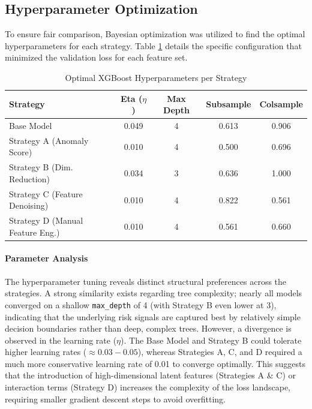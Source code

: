 \documentclass{report}\usepackage[]{graphicx}\usepackage[]{xcolor}
\begin{document}
\subsection{Hyperparameter Optimization}

To ensure fair comparison, Bayesian optimization was utilized to find the optimal hyperparameters for each strategy. Table \ref{tab:params} details the specific configuration that minimized the validation loss for each feature set.

\begin{table}[h]
    \centering
    \caption{Optimal XGBoost Hyperparameters per Strategy}
    \label{tab:params}
    \begin{tabular}{lcccc}
        \hline
        \textbf{Strategy} & \textbf{Eta ($\eta$)} & \textbf{Max Depth} & \textbf{Subsample} & \textbf{Colsample} \\
        \hline
        Base Model & 0.049 & 4 & 0.613 & 0.906 \\
        Strategy A (Anomaly Score) & 0.010 & 4 & 0.500 & 0.696 \\
        Strategy B (Dim. Reduction) & 0.034 & 3 & 0.636 & 1.000 \\
        Strategy C (Feature Denoising) & 0.010 & 4 & 0.822 & 0.561 \\
        Strategy D (Manual Feature Eng.) & 0.010 & 4 & 0.561 & 0.660 \\
        \hline
    \end{tabular}
\end{table}

\paragraph{Parameter Analysis}
The hyperparameter tuning reveals distinct structural preferences across the strategies. A strong similarity exists regarding tree complexity; nearly all models converged on a shallow \texttt{max\_depth} of 4 (with Strategy B even lower at 3), indicating that the underlying risk signals are captured best by relatively simple decision boundaries rather than deep, complex trees. However, a divergence is observed in the learning rate ($\eta$). The Base Model and Strategy B could tolerate higher learning rates ($\approx 0.03 - 0.05$), whereas Strategies A, C, and D required a much more conservative learning rate of 0.01 to converge optimally. This suggests that the introduction of high-dimensional latent features (Strategies A \& C) or interaction terms (Strategy D) increases the complexity of the loss landscape, requiring smaller gradient descent steps to avoid overfitting.
\end{document}
